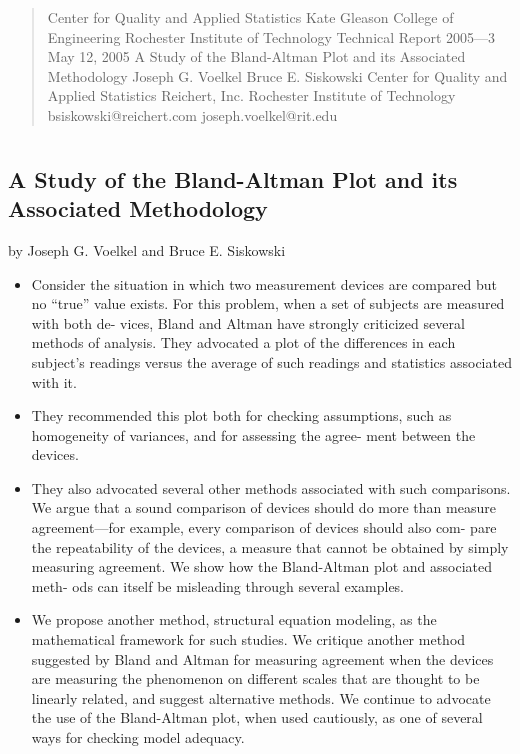 \documentclass[]{article}
\title{}
\author{}
\begin{document}
	
	\maketitle
	
	\begin{abstract}
		Center for Quality and Applied Statistics
		Kate Gleason College of Engineering
		Rochester Institute of Technology
		Technical Report 2005—3
		May 12, 2005
		A Study of the Bland-Altman Plot
		and its Associated Methodology
		Joseph G. Voelkel Bruce E. Siskowski
		Center for Quality and Applied Statistics Reichert, Inc.
		Rochester Institute of Technology bsiskowski@reichert.com
		joseph.voelkel@rit.edu
		
	\end{abstract}
	
	\section{}
	






\subsection*{A Study of the Bland-Altman Plot and its Associated Methodology}
by
Joseph G. Voelkel and Bruce E. Siskowski

\begin{itemize}
\item Consider the situation in which two measurement devices are compared but no “true” value exists. For this problem, when a set of subjects are measured with both de-
vices, Bland and Altman have strongly criticized several methods of analysis. They advocated a plot of the differences in each subject’s readings versus the average of
such readings and statistics associated with it. 
\item They recommended this plot both for
checking assumptions, such as homogeneity of variances, and for assessing the agree-
ment between the devices. 
\item They also advocated several other methods associated
with such comparisons. We argue that a sound comparison of devices should do more
than measure agreement—for example, every comparison of devices should also com-
pare the repeatability of the devices, a measure that cannot be obtained by simply measuring agreement. We show how the Bland-Altman plot and associated meth-
ods can itself be misleading through several examples. 
\item We propose another method,
structural equation modeling, as the mathematical framework for such studies. We
critique another method suggested by Bland and Altman for measuring agreement
when the devices are measuring the phenomenon on different scales that are thought
to be linearly related, and suggest alternative methods. We continue to advocate
the use of the Bland-Altman plot, when used cautiously, as one of several ways for
checking model adequacy.
\end{itemize}
\end{document}
